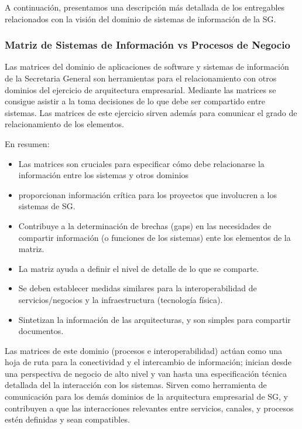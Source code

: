 \documentclass[
	a4paper, %
	12pt, %
]{include/CSSullivanBusinessReport}
\def\tightlist{}
\begin{document}
A continuación, presentamos una descripción más detallada de los
entregables relacionados con la visión del dominio de sistemas de
información de la SG.

\subsubsection{Matriz de Sistemas de Información vs Procesos de
Negocio}\label{sec:matriz-de-sistemas-de-informaciuxf3n-vs-procesos-de-negocio}

Las matrices del dominio de aplicaciones de software y sistemas de
información de la Secretaria General son herramientas para el
relacionamiento con otros dominios del ejercicio de arquitectura
empresarial. Mediante las matrices se consigue asistir a la toma
decisiones de lo que debe ser compartido entre sistemas. Las matrices de
este ejercicio sirven además para comunicar el grado de relacionamiento
de los elementos.

En resumen:

\begin{itemize}
\tightlist
\item
  Las matrices son cruciales para especificar cómo debe relacionarse la
  información entre los sistemas y otros dominios
\item
  proporcionan información crítica para los proyectos que involucren a
  los sistemas de SG.
\item
  Contribuye a la determinación de brechas (gaps) en las necesidades de
  compartir información (o funciones de los sistemas) ente los elementos
  de la matriz.
\item
  La matriz ayuda a definir el nivel de detalle de lo que se comparte.
\item
  Se deben establecer medidas similares para la interoperabilidad de
  servicios/negocios y la infraestructura (tecnología física).
\item
  Sintetizan la información de las arquitecturas, y son simples para
  compartir documentos.
\end{itemize}

Las matrices de este dominio (procesos e interoperabilidad) actúan como
una hoja de ruta para la conectividad y el intercambio de información;
inician desde una perspectiva de negocio de alto nivel y van hasta una
especificación técnica detallada del la interacción con los sistemas.
Sirven como herramienta de comunicación para los demás dominios de la
arquitectura empresarial de SG, y contribuyen a que las interacciones
relevantes entre servicios, canales, y procesos estén definidas y sean
compatibles.
\end{document}
